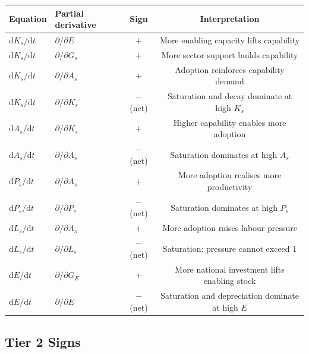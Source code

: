 \documentclass[11pt,a4paper]{article}
\begin{document}
\begin{center}
\begin{tabular}{llcc}
\toprule
Equation & Partial derivative & Sign & Interpretation \\
\midrule
$\mathrm{d}K_s/\mathrm{d}t$ & $\partial/\partial E$ & $+$ & More enabling capacity lifts capability \\
$\mathrm{d}K_s/\mathrm{d}t$ & $\partial/\partial G_s$ & $+$ & More sector support builds capability \\
$\mathrm{d}K_s/\mathrm{d}t$ & $\partial/\partial A_s$ & $+$ & Adoption reinforces capability demand \\
$\mathrm{d}K_s/\mathrm{d}t$ & $\partial/\partial K_s$ & $-$ (net) & Saturation and decay dominate at high $K_s$ \\
$\mathrm{d}A_s/\mathrm{d}t$ & $\partial/\partial K_s$ & $+$ & Higher capability enables more adoption \\
$\mathrm{d}A_s/\mathrm{d}t$ & $\partial/\partial A_s$ & $-$ (net) & Saturation dominates at high $A_s$ \\
$\mathrm{d}P_s/\mathrm{d}t$ & $\partial/\partial A_s$ & $+$ & More adoption realises more productivity \\
$\mathrm{d}P_s/\mathrm{d}t$ & $\partial/\partial P_s$ & $-$ (net) & Saturation dominates at high $P_s$ \\
$\mathrm{d}L_s/\mathrm{d}t$ & $\partial/\partial A_s$ & $+$ & More adoption raises labour pressure \\
$\mathrm{d}L_s/\mathrm{d}t$ & $\partial/\partial L_s$ & $-$ (net) & Saturation: pressure cannot exceed 1 \\
$\mathrm{d}E/\mathrm{d}t$   & $\partial/\partial G_E$ & $+$ & More national investment lifts enabling stock \\
$\mathrm{d}E/\mathrm{d}t$   & $\partial/\partial E$ & $-$ (net) & Saturation and depreciation dominate at high $E$ \\
\bottomrule
\end{tabular}
\end{center}

\subsection{Tier 2 Signs}
\end{document}
